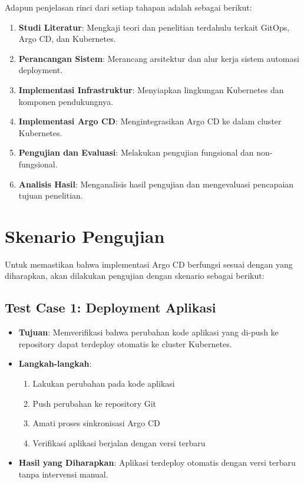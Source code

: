 Adapun penjelasan rinci dari setiap tahapan adalah sebagai berikut:
\begin{enumerate}
    \item \textbf{Studi Literatur}: Mengkaji teori dan penelitian terdahulu terkait GitOps, Argo CD, dan Kubernetes.
    \item \textbf{Perancangan Sistem}: Merancang arsitektur dan alur kerja sistem automasi deployment.
    \item \textbf{Implementasi Infrastruktur}: Menyiapkan lingkungan Kubernetes dan komponen pendukungnya.
    \item \textbf{Implementasi Argo CD}: Mengintegrasikan Argo CD ke dalam cluster Kubernetes.
    \item \textbf{Pengujian dan Evaluasi}: Melakukan pengujian fungsional dan non-fungsional.
    \item \textbf{Analisis Hasil}: Menganalisis hasil pengujian dan mengevaluasi pencapaian tujuan penelitian.
\end{enumerate}

\section{Skenario Pengujian}
Untuk memastikan bahwa implementasi Argo CD berfungsi sesuai dengan yang diharapkan, akan dilakukan pengujian dengan skenario sebagai berikut:

\subsection{Test Case 1: Deployment Aplikasi}
\begin{itemize}
    \item \textbf{Tujuan}: Memverifikasi bahwa perubahan kode aplikasi yang di-push ke repository dapat terdeploy otomatis ke cluster Kubernetes.
    \item \textbf{Langkah-langkah}:
    \begin{enumerate}
        \item Lakukan perubahan pada kode aplikasi
        \item Push perubahan ke repository Git
        \item Amati proses sinkronisasi Argo CD
        \item Verifikasi aplikasi berjalan dengan versi terbaru
    \end{enumerate}
    \item \textbf{Hasil yang Diharapkan}: Aplikasi terdeploy otomatis dengan versi terbaru tanpa intervensi manual.
\end{itemize}

